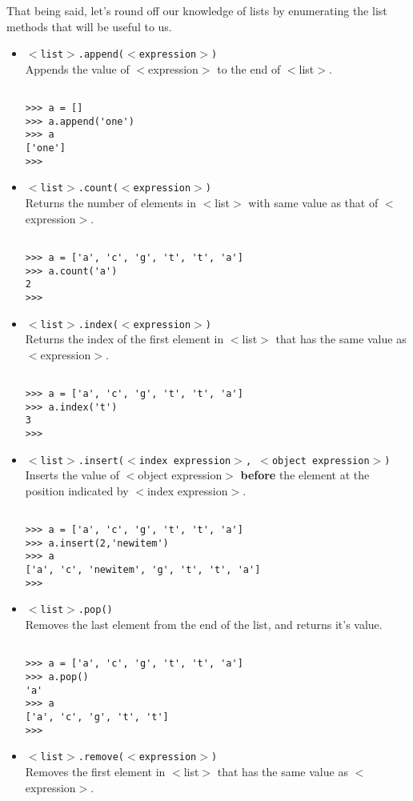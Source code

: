 That being said, let's round off our knowledge of lists by   enumerating the list methods that will be useful to us.
\begin{itemize}
	\item 
\texttt{$<$list$>$.append($<$expression$>$)}
\\     Appends the value of $<$expression$>$ to the end of     $<$list$>$.      
\begin{lstlisting}

>>> a = []
>>> a.append('one')
>>> a
['one']
>>>
\end{lstlisting}
	\item 
\texttt{$<$list$>$.count($<$expression$>$)}
\\     Returns the number of elements in $<$list$>$ with same value     as that of $<$expression$>$.      
\begin{lstlisting}

>>> a = ['a', 'c', 'g', 't', 't', 'a']
>>> a.count('a')
2
>>>
\end{lstlisting}
	\item 
\texttt{$<$list$>$.index($<$expression$>$)}
\\     Returns the index of the first element in $<$list$>$ that has     the same value as $<$expression$>$.      
\begin{lstlisting}

>>> a = ['a', 'c', 'g', 't', 't', 'a']
>>> a.index('t')
3
>>>
\end{lstlisting}
	\item 
\texttt{$<$list$>$.insert($<$index expression$>$, $<$object     expression$>$)}
\\ Inserts the value of $<$object     expression$>$ \textbf{before} the element at the     position indicated by $<$index expression$>$.      
\begin{lstlisting}

>>> a = ['a', 'c', 'g', 't', 't', 'a']
>>> a.insert(2,'newitem')
>>> a
['a', 'c', 'newitem', 'g', 't', 't', 'a']
>>>
\end{lstlisting}
	\item 
\texttt{$<$list$>$.pop()}
\\ Removes the last element     from the end of the list, and returns it's value.      
\begin{lstlisting}

>>> a = ['a', 'c', 'g', 't', 't', 'a']
>>> a.pop()
'a'
>>> a
['a', 'c', 'g', 't', 't']
>>>
\end{lstlisting}
	\item 
\texttt{$<$list$>$.remove($<$expression$>$)}
\\     Removes the first element in $<$list$>$ that has the same     value as $<$expression$>$.      
\begin{lstlisting}


\end{lstlisting}
\end{itemize}

